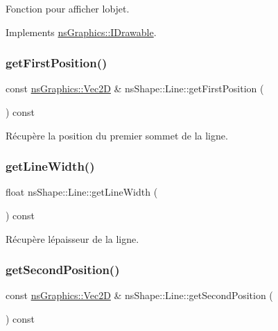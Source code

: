Fonction pour afficher l\textquotesingle{}objet. 



Implements \hyperlink{classns_graphics_1_1_i_drawable_abed8a61e1d507d31e76f0891f3bf9c51}{ns\+Graphics\+::\+I\+Drawable}.

\mbox{\label{classns_shape_1_1_line_a5e99d542b7557f79f58623b098672fdc}} 
\subsubsection{\texorpdfstring{get\+First\+Position()}{getFirstPosition()}}
{\footnotesize\ttfamily const \hyperlink{classns_graphics_1_1_vec2_d}{ns\+Graphics\+::\+Vec2D} \& ns\+Shape\+::\+Line\+::get\+First\+Position (\begin{DoxyParamCaption}{ }\end{DoxyParamCaption}) const}



Récupère la position du premier sommet de la ligne. 

\mbox{\label{classns_shape_1_1_line_aab6e3cacd0062c1d5e2e55e9099a617a}} 
\subsubsection{\texorpdfstring{get\+Line\+Width()}{getLineWidth()}}
{\footnotesize\ttfamily float ns\+Shape\+::\+Line\+::get\+Line\+Width (\begin{DoxyParamCaption}{ }\end{DoxyParamCaption}) const}



Récupère l\textquotesingle{}épaisseur de la ligne. 

\mbox{\label{classns_shape_1_1_line_a3e239062daea5c0f247ccd9f454a45e8}} 
\subsubsection{\texorpdfstring{get\+Second\+Position()}{getSecondPosition()}}
{\footnotesize\ttfamily const \hyperlink{classns_graphics_1_1_vec2_d}{ns\+Graphics\+::\+Vec2D} \& ns\+Shape\+::\+Line\+::get\+Second\+Position (\begin{DoxyParamCaption}{ }\end{DoxyParamCaption}) const}



